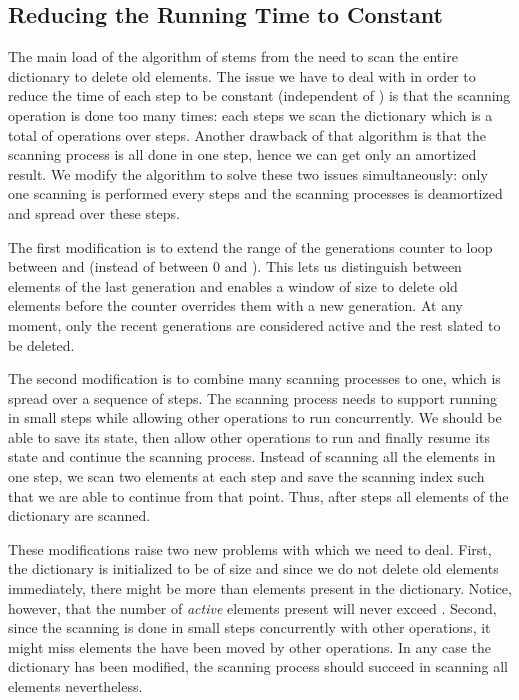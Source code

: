 \documentclass[11pt]{article}
\begin{document}
\subsection{Reducing the Running Time to Constant}


The main load of the algorithm of  stems from the need to scan the entire dictionary to delete old elements. The issue we have to deal with in order to reduce the time of each step to be constant (independent of ) is that the scanning operation is done too many times: each  steps we scan the dictionary which is a total of  operations over  steps. Another drawback of that algorithm is that the scanning process is all done in one step, hence we can get only an amortized result. We modify the algorithm to solve these two issues simultaneously: only one scanning is performed every  steps and the scanning processes is deamortized and spread over these  steps.

The first modification is to extend the range of the generations counter  to loop between  and  (instead of between 0 and ). This lets us distinguish between elements of the last  generation and enables a window of size  to delete old elements before the counter overrides them with a new generation. At any moment, only the  recent generations are considered active and the rest slated to be deleted.

The second modification is to combine many scanning processes to one, which is spread over a sequence of  steps. The scanning process needs to support running in small steps while allowing other operations to run concurrently. We should be able to save its state, then allow other operations to run and finally resume its state and continue the scanning process. Instead of scanning all the  elements in one step, we scan two elements at each step and save the scanning index such that we are able to continue from that point. Thus, after  steps all  elements of the dictionary are scanned.

These modifications raise two new problems with which we need to deal. First, the dictionary is initialized to be of size  and since we do not delete old elements immediately, there might be more than  elements present in the dictionary. Notice, however, that the number of \emph{active} elements present will never exceed . Second, since the scanning is done in small steps concurrently with other operations, it might miss elements the have been moved by other operations. In any case the dictionary has been modified, the scanning process should succeed in scanning all elements nevertheless.
\end{document}
